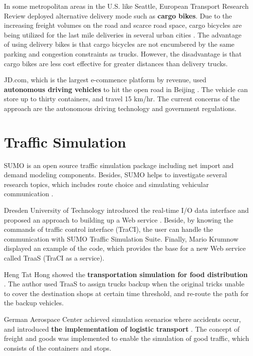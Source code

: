 \documentclass[12pt]{ksthesis}
\begin{document}
\begin{thesis}
{%
In some metropolitan areas in the U.S. like Seattle, European Transport Research Review deployed alternative delivery mode such as \textbf{cargo bikes}\cite{Sheth2019}. Due to the increasing freight volumes on the road and scarce road space, cargo bicycles are being utilized for the last mile deliveries in several urban cities \cite{Melo2017}. The advantage of using delivery bikes is that cargo bicycles are not encumbered by the same parking and congestion constraints as trucks. However, the disadvantage is that cargo bikes are less cost effective for greater distances than delivery trucks.

JD.com, which is the largest e-commence platform by revenue, used \textbf{autonomous driving vehicles} to hit the open road in Beijing \cite{xia2018last}. The vehicle can store up to thirty containers, and travel 15 km/hr. The current concerns of the approach are the autonomous driving technology and government regulations.

\section{Traffic Simulation}
SUMO is an open source traffic simulation package including net import and demand modeling components. Besides, SUMO helps to investigate several research topics, which includes route choice and simulating vehicular communication  \cite{behrisch2011sumo}.

Dresden University of Technology introduced the real-time I/O data interface and proposed an approach to building up a Web service \cite{10.1007/978-3-662-45079-6_5}. 
Beside, by knowing the commands of traffic control interface (TraCI), the user can handle the communication with SUMO Traffic Simulation Suite. Finally, Mario Krumnow displayed an example of the code, which provides the base for a new Web service called TraaS (TraCI as a service).

Heng Tat Hong showed the \textbf{transportation simulation for food distribution} \cite{hong2016intelligent}. The author used TraaS to assign trucks backup when the original tricks unable to cover the destination shops at certain time threshold, and re-route the path for the backup vehicles.

German Aerospace Center achieved simulation scenarios where accidents occur, and introduced \textbf{the implementation of logistic transport} \cite{Kendziorra2015}. The concept of freight and goods was implemented to enable the simulation of good traffic, which consists of the containers and stops.



}
\end{thesis}
\end{document}

